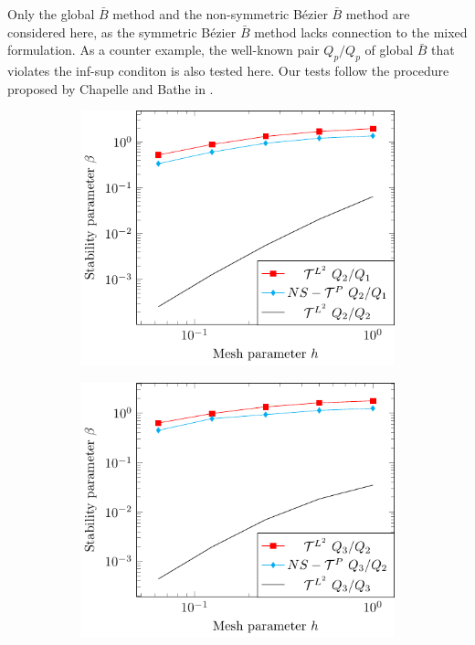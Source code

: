 \documentclass{article}
\newcommand{\Bezier}{{B\'{e}zier} }
\begin{document}
Only the global $\bar{B}$ method and the non-symmetric \Bezier $\bar{B}$ method are considered here, as the symmetric \Bezier $\bar{B}$ method lacks connection to the mixed formulation. As a counter example, the well-known pair $Q_p/Q_p$ of global $\bar{B}$ that violates the inf-sup conditon is also tested here. Our tests follow the procedure proposed by Chapelle and Bathe in \cite{chapelle_inf-sup_1993}.\par
\begin{figure}[htb!]
    \centering
    \begin{subfigure}[b]{0.31\linewidth}        %
        \centering
        \includegraphics[width=\linewidth]{beta_p_2}
    \end{subfigure}
    \begin{subfigure}[b]{0.31\linewidth}        %
        \centering
        \includegraphics[width=\linewidth]{beta_p_3}

\end{subfigure}
\end{figure}
\end{document}
